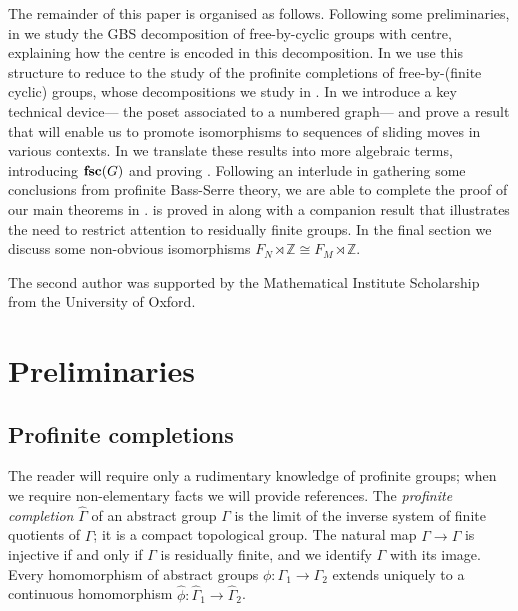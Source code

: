 \documentclass[11pt, a4 paper]{amsart}
\numberwithin{equation}{section}
\theoremstyle{remark}
\theoremstyle{definition}
\def\Z{\mathbb Z}
\def\G{\Gamma}
\def\wh{\widehat}
\def\tsc{{\rm{\bf{fsc}}}}
\def\G{\Gamma}
\begin{document}
The remainder of this paper is organised as follows. 
Following some preliminaries, 
in  we study 
the GBS decomposition of free-by-cyclic groups with centre, 
explaining how the centre is encoded in this decomposition. 
In  we use this structure 
to reduce  
to the study of 
the profinite completions of free-by-(finite cyclic) groups, 
whose decompositions we study in . 
In  we introduce a key technical device---%
the poset associated to a numbered graph---%
and prove a result that will enable us 
to promote isomorphisms
to sequences of sliding moves in various contexts. 
In  we translate these results into
more algebraic terms, introducing $\tsc(G)$ 
and proving . 
Following an interlude in  
gathering some conclusions from  profinite Bass-Serre theory, 
we are able to complete the proof of our main theorems 
in . 
 is proved in  
along with a companion result 
that illustrates the need to restrict attention 
to residually finite groups. 
In the final section we discuss 
some non-obvious isomorphisms $F_N\rtimes\Z\cong F_M\rtimes\Z$. 
\smallskip

The second author was supported by 
the Mathematical Institute Scholarship 
from the University of Oxford. 



\section{Preliminaries}


\subsection{Profinite completions} 

The reader will require only 
a rudimentary knowledge of profinite groups; 
when we require non-elementary facts we will provide references. 
The {\em profinite completion} $\wh{\G}$ 
of an abstract group $\G$ 
is the limit of the inverse system of finite quotients of $\G$; 
it is a compact topological group. 
The natural map $\G\to\wh{\G}$ is injective 
if and only if $\G$ is residually finite, 
and we identify $\G$ with its image. 
Every homomorphism of abstract groups $\phi:\G_1\to\G_2$ 
extends uniquely to a continuous homomorphism 
$\wh{\phi}:\wh{\G}_1\to\wh{\G}_2$. 
\end{document}
